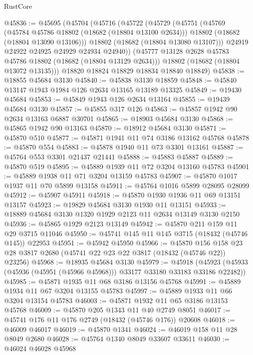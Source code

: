 \begin{lexlean}{RustCore}
\begin{coremodule}
@45836 := @45695
    (@45704
      (@45716
        (@45722
          (@45729
            (@45751
              (@45769
                (@45784 @45786 @18802 (@18682 (@18804 @13100 @2634)))
                @18802
                (@18682 (@18804 @13090 @13106)))
              @18802
              (@18682 (@18804 @13080 @13107)))
            @24919
            @24922
            @24925
            @24929
            @24934
            @24940))
        (@45777 @13128 @2628 @45783 @45786 @18802 (@18682 (@18804 @13129 @2634)))
        @18802
        (@18682 (@18804 @13072 @13135)))
      @18820
      @18824
      @18829
      @18834
      @18840
      @18849)
@45838 := @18855 @45684 @3130
@45840 := @45838 @3130 @18859
@45848 := @45840 @13147 @1943 @1984 @126 @2634 @13165 @13189 @13325
@45849 := @19430 @45684
@45853 := @45849 @1943 @126 @2634 @13164
@45855 := @19439 @45684 @3130
@45857 := @45855 @317 @126
@45863 := @45857 @1942 @90 @2634 @13163 @6887 @30701
@45865 := @18903 @45684 @3130
@45868 := @45865 @1942 @90 @13163
@45870 := @18912 @45684 @3130
@45871 := @45870 @510
@45877 := @45871 @1941 @11 @74 @3186 @13162 @45768
@45878 := @45870 @554
@45883 := @45878 @1940 @11 @73 @3301 @13161
@45887 := @45764 @553 @3301 @21437 @21441
@45888 := @45883 @45887
@45889 := @45870 @519
@45895 := @45889 @1939 @11 @72 @3204 @13160 @45783
@45901 := @45889 @1938 @11 @71 @3204 @13159 @45783
@45907 := @45870 @1017 @1937 @11 @70 @5899 @13158
@45911 := @45764 @1016 @5899 @28095 @28099
@45912 := @45907 @45911
@45918 := @45870 @1930 @1936 @11 @69 @13151 @13157
@45923 := @19829 @45684 @3130 @1930 @11 @13151
@45933 := @18889 @45684 @3130 @1320 @1929 @2123 @11 @2634 @13149 @3130 @2150
@45936 := @45865 @1929 @2123 @13149
@45942 := @45870 @211 @159 @11 @29 @3715 @11046
@45950 := @45741 @145 @11 @145 @3715 (@18432 (@45746 @145)) @22953
@45951 := @45942 @45950
@45966 := @45870
    @156
    @158
    @23
    @28
    @3817
    @2680
    (@45741 @22 @23 @22 @3817 (@18432 (@45746 @22)) @23256)
@45968 := @18935 @45684 @3130
@45979 := @45918
    (@45923 (@45933 (@45936 (@45951 (@45966 @45968))) @33177 @33180 @33183 @33186 @22482))
@45985 := @45871 @1935 @11 @68 @3186 @13156 @45768
@45991 := @45889 @1934 @11 @67 @3204 @13155 @45783
@45997 := @45889 @1933 @11 @66 @3204 @13154 @45783
@46003 := @45871 @1932 @11 @65 @3186 @13153 @45768
@46009 := @45870 @205 @1343 @11 @40 @2749 @8051
@46017 := @45741 @176 @11 @176 @2749 (@18432 (@45746 @176)) @20608
@46018 := @46009 @46017
@46019 := @45870 @1341
@46024 := @46019 @158 @11 @28 @8049 @2680
@46028 := @45764 @1340 @8049 @33607 @33611
@46030 := @46024 @46028 @45968

\end{coremodule}
\end{lexlean}
